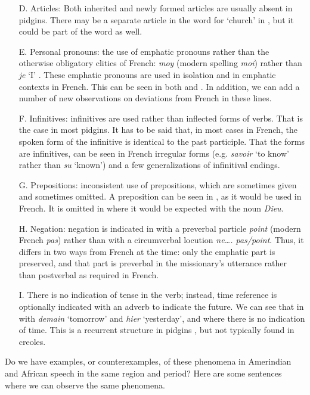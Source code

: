 \documentclass[output=paper,colorlinks,citecolor=brown]{langscibook}
\begin{document}
\begin{itemize}
\item [D.] Articles: Both inherited and newly formed articles are usually absent in pidgins. There may be a separate article in the word for `church'  in , but it could be part of the word as well.
\item [E.] Personal pronouns: the use of emphatic pronouns rather than the otherwise obligatory clitics of French: \textit{moy} (modern spelling \textit{moi}) rather than \textit{je} `I' . These emphatic pronouns are used in isolation and in emphatic contexts in French. This can be seen in both  and .
In addition, we can add a number of new observations on deviations from French in these lines.
\item [F.] Infinitives: infinitives are used rather than inflected forms of verbs. That is the case in most pidgins. It has to be said that, in most cases in French, the spoken form of the infinitive is identical to the past participle. That the forms are infinitives, can be seen in French irregular forms (e.g. \textit{savoir }`to know'  rather than \textit{su} `known') and a few generalizations of infinitival endings.
\item [G.] Prepositions: inconsistent use of prepositions, which are sometimes given and sometimes omitted. A preposition can be seen in , as it would be used in French. It is omitted in  where it would be expected with the noun \textit{Dieu}.
\item [H.] Negation: negation is indicated in  with a preverbal particle \textit{point} (modern French \textit{pas}) rather than with a circumverbal locution \textit{ne…. pas/point}. Thus, it differs in two ways from French at the time: only the emphatic part is preserved, and that part is preverbal in the missionary’s utterance rather than postverbal as required in French.
\item [I.] There is no indication of tense in the verb; instead, time reference is optionally indicated with an adverb to indicate the future. We can see that in  with \textit{demain} `tomorrow'  and \textit{hier }`yesterday', and  where there is no indication of time. This is a recurrent structure in pidgins \citep{ParkvallBakker2013, Parkvall2017}, but not typically found in creoles.
\end{itemize}
Do we have examples, or counterexamples, of these phenomena in Amerindian and African speech in the same region and period? Here are some sentences where we can observe the same phenomena.
\end{document}
